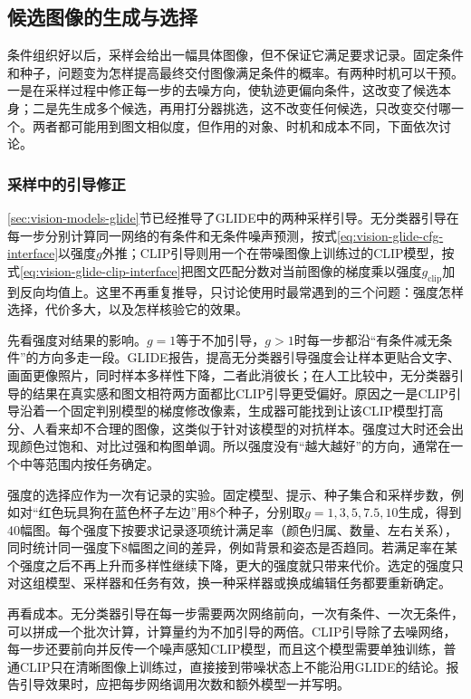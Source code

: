 \subsection{候选图像的生成与选择}
\label{sec:vision-generation-selection}

条件组织好以后，采样会给出一幅具体图像，但不保证它满足要求记录。固定条件和种子，问题变为怎样提高最终交付图像满足条件的概率。有两种时机可以干预。一是在采样过程中修正每一步的去噪方向，使轨迹更偏向条件，这改变了候选本身；二是先生成多个候选，再用打分器挑选，这不改变任何候选，只改变交付哪一个。两者都可能用到图文相似度，但作用的对象、时机和成本不同，下面依次讨论。

\subsubsection{采样中的引导修正}
\label{sec:vision-generation-glide-guidance}

\ref{sec:vision-models-glide}节已经推导了GLIDE中的两种采样引导。无分类器引导在每一步分别计算同一网络的有条件和无条件噪声预测，按式\eqref{eq:vision-glide-cfg-interface}以强度$g$外推；CLIP引导则用一个在带噪图像上训练过的CLIP模型，按式\eqref{eq:vision-glide-clip-interface}把图文匹配分数对当前图像的梯度乘以强度$g_{\mathrm{clip}}$加到反向均值上。这里不再重复推导，只讨论使用时最常遇到的三个问题：强度怎样选择，代价多大，以及怎样核验它的效果。

先看强度对结果的影响。$g=1$等于不加引导，$g>1$时每一步都沿“有条件减无条件”的方向多走一段。GLIDE报告，提高无分类器引导强度会让样本更贴合文字、画面更像照片，同时样本多样性下降，二者此消彼长；在人工比较中，无分类器引导的结果在真实感和图文相符两方面都比CLIP引导更受偏好。原因之一是CLIP引导沿着一个固定判别模型的梯度修改像素，生成器可能找到让该CLIP模型打高分、人看来却不合理的图像，这类似于针对该模型的对抗样本。强度过大时还会出现颜色过饱和、对比过强和构图单调。所以强度没有“越大越好”的方向，通常在一个中等范围内按任务确定。

强度的选择应作为一次有记录的实验。固定模型、提示、种子集合和采样步数，例如对“红色玩具狗在蓝色杯子左边”用8个种子，分别取$g=1,3,5,7.5,10$生成，得到40幅图。每个强度下按要求记录逐项统计满足率（颜色归属、数量、左右关系），同时统计同一强度下8幅图之间的差异，例如背景和姿态是否趋同。若满足率在某个强度之后不再上升而多样性继续下降，更大的强度就只带来代价。选定的强度只对这组模型、采样器和任务有效，换一种采样器或换成编辑任务都要重新确定。

再看成本。无分类器引导在每一步需要两次网络前向，一次有条件、一次无条件，可以拼成一个批次计算，计算量约为不加引导的两倍。CLIP引导除了去噪网络，每一步还要前向并反传一个噪声感知CLIP模型，而且这个模型需要单独训练，普通CLIP只在清晰图像上训练过，直接接到带噪状态上不能沿用GLIDE的结论。报告引导效果时，应把每步网络调用次数和额外模型一并写明。

